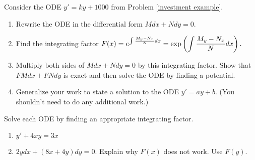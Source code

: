 \begin{problem}
Consider the ODE $y'=ky+1000$ from  Problem \ref{investment example}.
\begin{enumerate}
 \item Rewrite the ODE in the differential form $Mdx+Ndy=0$. 
 \item Find the integrating factor $\displaystyle F(x)=e^{\int \frac{M_y-N_x}{N} dx} = \exp\left(\int \frac{M_y-N_x}{N} dx\right).$
 \item 
{}%
Multiply both sides of $Mdx+Ndy=0$ by this integrating factor. Show that $FMdx+FNdy$ is exact and then solve the ODE by finding a potential. 
 \item 
Generalize your work to state a solution to the ODE $y'=ay+b$. (You shouldn't need to do any additional work.) 
\end{enumerate}
\end{problem}


\begin{problem}\label{solving ODEs by finding an integrating factor}
%
Solve each ODE by finding an appropriate integrating factor. 
\begin{enumerate}
 \item  $y'+4xy = 3x$ 
 \item  $2ydx+(8x+4y)dy=0$. Explain why $F(x)$ does not work. Use $F(y)$.
\end{enumerate}
\end{problem}

\subsection*{\ideaD}

